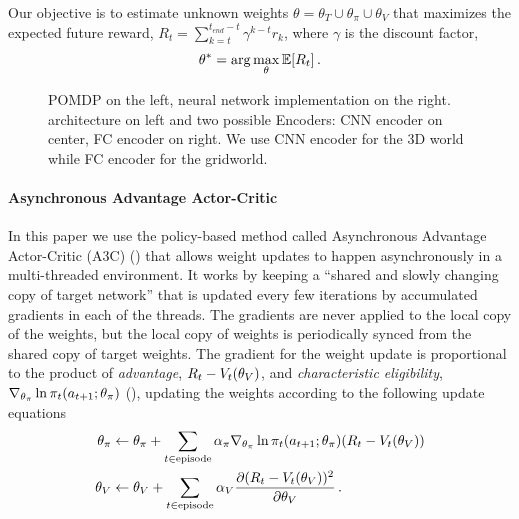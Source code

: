 Our objective is to estimate unknown weights $\theta = \theta_T \cup \theta_\pi \cup \theta_V$ that maximizes the expected future reward, $R_t = \sum_{k=t}^{t_{end} - t} \gamma^{k-t} r_k$, where $\gamma$ is the discount factor,
%
\begin{align}
\theta^* = \arg\max_{\theta} \mathbb{E}[R_t] \,.
\end{align}
%
\def\svgwidth{0.25\columnwidth}%
\begin{figure}%
%
\def\svgwidth{0.25\columnwidth}%
%
\hspace{-1ex}%
\hspace{-1ex}%
%
\caption{POMDP on the left, neural network implementation on the right. \NavAiiiCDiDiiL{} architecture on left and two possible Encoders: CNN encoder on center, FC encoder on right. We use CNN encoder for the 3D world while FC encoder for the gridworld.
}
\label{fig:architectures}
\end{figure}

\paragraph{Asynchronous Advantage Actor-Critic}
\def\charelig{\nabla_{\theta_\pi}\ln \pit(\acttn; \theta_\pi)}
In this paper we use the policy-based method called Asynchronous Advantage Actor-Critic (A3C) (\cite{MnBaMiICML2016}) that allows weight updates to happen asynchronously in a multi-threaded environment.
It works by keeping a ``shared and slowly changing copy of target network'' that is updated every few iterations by accumulated gradients in each of the threads.
The gradients are never applied to the local copy of the weights, but the local copy of weights is periodically synced from the shared copy of target weights.
The gradient for the weight update is proportional to the product of \emph{advantage}, $R_t - V_t(\theta_V)$, and \emph{characteristic eligibility}, $\charelig$ (\cite{WiML1992}), updating the weights according to the following update equations
\begin{align}
  \theta_\pi &\leftarrow \theta_\pi
  + \sum_{t \in \text{episode}}\alpha_\pi \charelig (R_t - \Value_t(\theta_\Value))
  \\
  \theta_\Value &\leftarrow \theta_\Value
  + \sum_{t \in \text{episode}} \alpha_\Value \frac{\partial (R_t - \Value_t(\theta_\Value))^2}
                  {\partial\theta_\Value}
                  \, .
\end{align}

